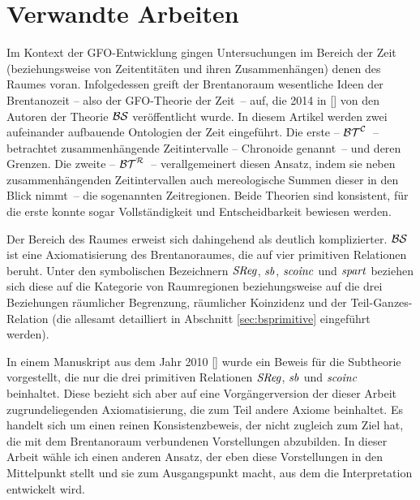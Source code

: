 \section{Verwandte Arbeiten}
Im Kontext der GFO-Entwicklung gingen Untersuchungen im Bereich der Zeit (beziehungsweise
von Zeitentitäten und ihren Zusammenhängen) denen des Raumes voran.
    Infolgedessen greift der Brentanoraum
    wesentliche Ideen der Brentanozeit -- also der GFO-Theorie der Zeit~-- auf, die 2014 in [\cite{baumann-r-2014-171-a}] von den Autoren der Theorie $\mathcal{BS}$ veröffentlicht wurde.
    In diesem Artikel werden zwei aufeinander aufbauende Ontologien der Zeit eingeführt.
    Die erste -- $\mathcal{BT}^{\mathcal{C}}$~-- betrachtet zusammenhängende Zeitintervalle -- Chronoide genannt~-- und deren Grenzen. 
    Die zweite -- $\mathcal{BT}^{\mathcal{R}}$~-- verallgemeinert diesen Ansatz, indem sie neben zusammenhängenden Zeitintervallen auch mereologische Summen dieser in den Blick nimmt~-- die sogenannten Zeitregionen.
    Beide Theorien sind konsistent, für die erste konnte sogar Vollständigkeit und Entscheidbarkeit bewiesen werden.
    
Der Bereich des Raumes erweist sich dahingehend als deutlich komplizierter.
$\mathcal{BS}$ ist eine Axiomatisierung des Brentanoraumes, die auf vier primitiven Relationen beruht. 
Unter den symbolischen Bezeichnern $\mathit{S\hspace*{-0.25ex}Reg}$, $\mathit{sb}$, $\mathit{scoinc}$ und $\mathit{spart}$ beziehen sich diese auf die Kategorie von Raumregionen beziehungsweise auf die drei Beziehungen räumlicher Begrenzung, räumlicher Koinzidenz und der Teil-Ganzes-Relation (die allesamt
detailliert in Abschnitt \ref{sec:bsprimitive} eingeführt werden).

In einem Manuskript
aus dem Jahr 2010 [\cite{}] wurde ein Beweis für die Subtheorie vorgestellt, die nur die drei primitiven Relationen $\mathit{S\hspace*{-0.25ex}Reg}$, $\mathit{sb}$ und $\mathit{scoinc}$ beinhaltet.
Diese bezieht sich aber auf eine Vorgängerversion der dieser Arbeit zugrundeliegenden Axiomatisierung, die zum Teil andere Axiome beinhaltet.
Es handelt sich um einen reinen Konsistenzbeweis, der nicht zugleich zum Ziel hat, die mit dem Brentanoraum verbundenen Vorstellungen abzubilden.
In dieser Arbeit wähle ich einen anderen Ansatz, der eben diese Vorstellungen in den Mittelpunkt stellt und sie zum Ausgangspunkt macht, aus dem die Interpretation entwickelt wird.

